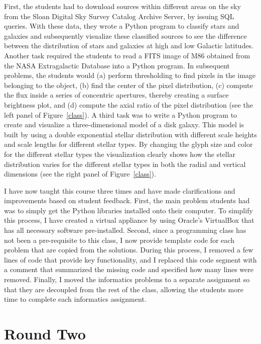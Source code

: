 First, the students had to download sources within different areas on the sky from the Sloan Digital Sky Survey Catalog Archive Server, by issuing SQL queries. With these data, they wrote a Python program to classify stars and galaxies and subsequently visualize these classified sources to see the difference between the distribution of stars and galaxies at high and low Galactic latitudes. Another task required the students to read a FITS image of M86 obtained from the NASA Extragalactic Database into a Python program. In subsequent problems, the students would (a) perform thresholding to find pixels in the image belonging to the object, (b) find the center of the pixel distribution, (c) compute the flux inside a series of concentric apertures, thereby creating a surface brightness plot, and (d) compute the axial ratio of the pixel distribution (see the left panel of Figure~\ref{class}). A third task was to write a Python program to create and visualize a three-dimensional model of a disk galaxy. This model is built by using a double exponential stellar distribution with different scale heights and scale lengths for different stellar types. By changing the glyph size and color for the different stellar types the visualization clearly shows how the stellar distribution varies for the different stellar types in both the radial and vertical dimensions (see the right panel of Figure~\ref{class}).

I have now taught this course three times and have made clarifications and improvements based on student feedback. First, the main problem students had was to simply get the Python libraries installed onto their computer. To simplify this process, I have created a virtual appliance by using Oracle's VirtualBox that has all necessary software pre-installed. Second, since a programming class has not been a pre-requisite to this class, I now provide template code for each problem that are copied from the solutions. During this process, I removed a few lines of code that provide key functionality, and I replaced this code segment with a comment that summarized the missing code and specified how many lines were removed. Finally, I moved the informatics problems to a separate assignment so that they are decoupled from the rest of the class, allowing the students more time to complete each informatics assignment.

\section{Round Two~\label{r2}}

